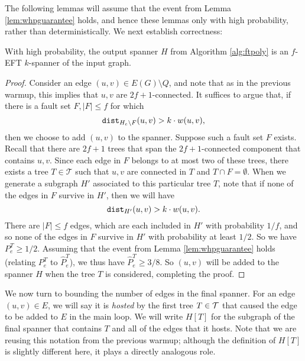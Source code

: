 The following lemmas will assume that the event from Lemma \ref{lem:whpguarantee} holds, and hence these lemmas only with high probability, rather than deterministically.
We next establish correctness:
\begin{lemma} \label{lem:poly-correct}
With high probability, the output spanner $H$ from Algorithm \ref{alg:ftpoly} is an $f$-EFT $k$-spanner of the input graph.
\end{lemma}
\begin{proof}
Consider an edge $(u, v) \in E(G) \setminus Q$, and note that as in the previous warmup, this implies that $u, v$ are $2f+1$-connected.
It suffices to argue that, if there is a fault set $F, |F| \le f$ for which 
$$\texttt{dist}_{H_e \setminus F}(u, v) > k \cdot w(u, v),$$
then we choose to add $(u, v)$ to the spanner.
Suppose such a fault set $F$ exists.
Recall that there are $2f+1$ trees that span the $2f+1$-connected component that contains $u, v$.
Since each edge in $F$ belongs to at most two of these trees, there exists a tree $T \in \mathcal{T}$ such that $u, v$ are connected in $T$ and $T \cap F = \emptyset$.
When we generate a subgraph $H'$ associated to this particular tree $T$, note that if none of the edges in $F$ survive in $H'$, then we will have
$$\texttt{dist}_{H'}(u, v) > k \cdot w(u, v).$$
There are $|F|\le f$ edges, which are each included in $H'$ with probability $1/f$, and so none of the edges in $F$ survive in $H'$ with probability at least $1/2$.
So we have $P_e^T \ge 1/2$.
Assuming that the event from Lemma \ref{lem:whpguarantee} holds (relating $P^T_e$ to $\widehat{P}_e^T$), we thus have $\widehat{P}_e^T \ge 3/8$.
So $(u, v)$ will be added to the spanner $H$ when the tree $T$ is considered, completing the proof.
\end{proof}

We now turn to bounding the number of edges in the final spanner.
For an edge $(u, v) \in E$, we will say it is \emph{hosted} by the first tree $T \in \mathcal{T}$ that caused the edge to be added to $E$ in the main loop.
We will write $H[T]$ for the subgraph of the final spanner that contains $T$ and all of the edges that it hosts.
Note that we are reusing this notation from the previous warmup; although the definition of $H[T]$ is slightly different here, it plays a directly analogous role.

